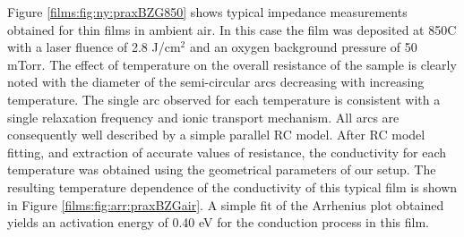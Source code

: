 Figure \ref{films:fig:ny:praxBZG850} shows typical impedance measurements obtained for thin films in ambient air. In this case the film was deposited at 850\textdegree C with a laser fluence of 2.8 J/cm$^2$ and an oxygen background pressure of 50 mTorr.  The effect of temperature on the overall resistance of the sample is clearly noted with the diameter of the semi-circular arcs decreasing with increasing temperature. The single arc observed for each temperature is consistent with a single relaxation frequency and ionic transport mechanism. All arcs are consequently well described by a simple parallel RC model.  After RC model fitting, and extraction of accurate values of resistance, the conductivity for each temperature was obtained using the geometrical parameters of our setup. The resulting temperature dependence of the conductivity of this typical film is shown in Figure \ref{films:fig:arr:praxBZGair}. A simple fit of the Arrhenius plot obtained yields an activation energy of 0.40 eV for the conduction process in this film.
